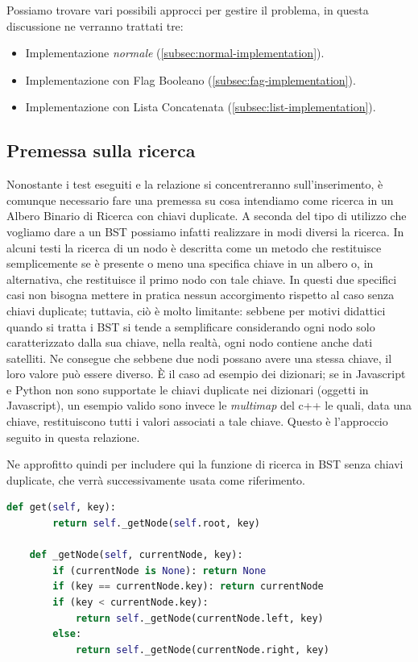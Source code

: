 \documentclass{article}
\begin{document}
Possiamo trovare vari possibili approcci per gestire il problema, in questa discussione ne verranno trattati tre:  



\begin{itemize}
	\item Implementazione \textit{normale} (\ref{subsec:normal-implementation}).
	\item Implementazione con Flag Booleano (\ref{subsec:fag-implementation}).
	\item Implementazione con Lista Concatenata (\ref{subsec:list-implementation}).
\end{itemize}




\subsection{Premessa sulla ricerca}\label{subsec:search-int}Nonostante i test eseguiti e la relazione si concentreranno  sull'inserimento, è comunque necessario fare una premessa su cosa intendiamo come ricerca in un Albero Binario di Ricerca con chiavi duplicate. A seconda del tipo di utilizzo che vogliamo dare a un BST possiamo infatti realizzare in modi diversi la ricerca. In alcuni testi la ricerca di un nodo è descritta come un metodo che restituisce semplicemente se è presente o meno una specifica chiave in un albero o, in alternativa, che restituisce il primo nodo con tale chiave. In questi due specifici casi non bisogna mettere in pratica nessun accorgimento rispetto al caso senza chiavi duplicate; tuttavia, ciò è molto limitante: sebbene per motivi didattici quando si tratta i BST si tende a semplificare considerando ogni nodo solo caratterizzato dalla sua chiave, nella realtà, ogni nodo contiene anche dati satelliti. Ne consegue che sebbene due nodi possano avere una stessa chiave, il loro valore può essere diverso.
È il caso ad esempio dei dizionari; se in Javascript e Python non sono supportate le chiavi duplicate nei dizionari (oggetti in Javascript), un esempio valido sono invece le \textit{multimap} del c++ le quali, data una chiave, restituiscono tutti i valori associati a tale chiave. Questo è l'approccio seguito in questa relazione. 
 
\vspace{15px}
Ne approfitto quindi per includere qui la funzione di ricerca in BST senza chiavi duplicate, che verrà successivamente usata come riferimento.
 
\begin{lstlisting}[language=Python, caption={Ricerca in un BST senza chiavi duplicate},label={lst:bst-search}]
    def get(self, key):
        return self._getNode(self.root, key)

    def _getNode(self, currentNode, key):
        if (currentNode is None): return None
        if (key == currentNode.key): return currentNode
        if (key < currentNode.key):
            return self._getNode(currentNode.left, key)
        else:
            return self._getNode(currentNode.right, key)
\end{lstlisting} 
 
\end{document}
